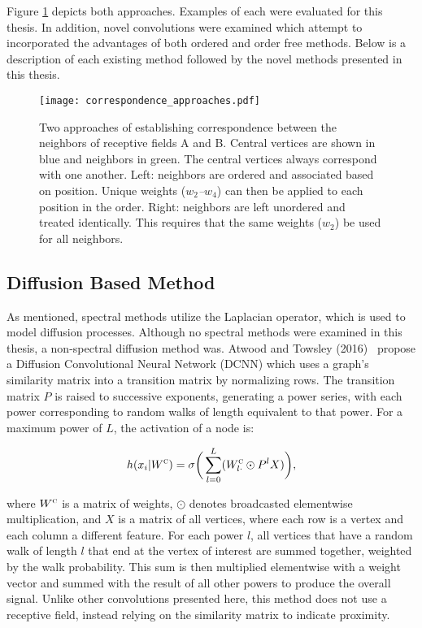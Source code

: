 Figure \ref{fig:correspondence_approaches} depicts both approaches.
Examples of each were evaluated for this thesis.
In addition, novel convolutions were examined which attempt to incorporated the advantages of both ordered and order free methods.
Below is a description of each existing method followed by the novel methods presented in this thesis. 

\begin{figure}
	\centering
	\texttt{[image: correspondence\_approaches.pdf]}
	\caption{Two approaches of establishing correspondence between the neighbors of receptive fields A and B. Central vertices are shown in blue and neighbors in green. The central vertices always correspond with one another. Left: neighbors are ordered and associated based on position. Unique weights (\textit{$w_2$--$w_4$}) can then be applied to each position in the order. Right: neighbors are left unordered and treated identically. This requires that the same weights (\textit{$w_2$}) be used for all neighbors.}
	\label{fig:correspondence_approaches}
\end{figure}


\subsection{Diffusion Based Method}
As mentioned, spectral methods utilize the Laplacian operator, which is used to model diffusion processes. 
Although no spectral methods were examined in this thesis, a non-spectral diffusion method was.
Atwood and Towsley (2016)~\cite{atwood2016} propose a Diffusion Convolutional Neural Network (DCNN) which uses a graph's similarity matrix into a transition matrix by normalizing rows.
The transition matrix $P$ is raised to successive exponents, generating a power series, with each power corresponding to random walks of length equivalent to that power.
For a maximum power of $L$, the activation of a node is:

\begin{equation}
h(x_i | W^\textsc{c}) = \sigma \bigg( \sum_{l=0}^L (W^\textsc{c}_{l\cdot} \odot P^l X ) \bigg),
\label{eq:diffusion}
\end{equation}

\noindent
where $W^\textsc{c}$ is a matrix of weights, $\odot$ denotes broadcasted elementwise multiplication, and $X$ is a matrix of all vertices, where each row is a vertex and each column a different feature.
For each power $l$, all vertices that have a random walk of length $l$ that end at the vertex of interest are summed together, weighted by the walk probability.
This sum is then multiplied elementwise with a weight vector and summed with the result of all other powers to produce the overall signal.
Unlike other convolutions presented here, this method does not use a receptive field, instead relying on the similarity matrix to indicate proximity.


